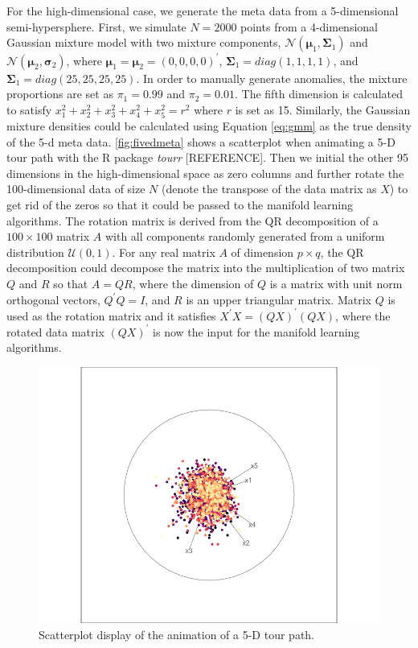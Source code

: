 \documentclass[11pt,a4paper,]{article}
\begin{document}
For the high-dimensional case, we generate the meta data from a 5-dimensional semi-hypersphere. First, we simulate \(N=2000\) points from a 4-dimensional Gaussian mixture model with two mixture components, \(\mathcal{N}(\pmb{\mu}_1, \pmb{\Sigma}_1)\) and \(\mathcal{N}(\pmb{\mu}_2, \pmb{\sigma}_2)\), where \(\pmb{\mu}_1 = \pmb{\mu}_2 =(0, 0, 0, 0)^\prime\), \(\pmb{\Sigma}_1 = diag(1,1,1,1)\), and \(\pmb{\Sigma}_1 = diag(25,25,25,25)\). In order to manually generate anomalies, the mixture proportions are set as \(\pi_1=0.99\) and \(\pi_2=0.01\).
The fifth dimension is calculated to satisfy \(x_1^2 + x_2^2 + x_3^2 + x_4^2 + x_5^2 = r^2\) where \(r\) is set as 15. Similarly, the Gaussian mixture densities could be calculated using Equation \eqref{eq:gmm} as the true density of the 5-d meta data. \autoref{fig:fivedmeta} shows a scatterplot when animating a 5-D tour path with the R package \emph{tourr} {[}REFERENCE{]}.
Then we initial the other 95 dimensions in the high-dimensional space as zero columns and further rotate the 100-dimensional data of size \(N\) (denote the transpose of the data matrix as \(X\)) to get rid of the zeros so that it could be passed to the manifold learning algorithms.
The rotation matrix is derived from the QR decomposition of a \(100\times 100\) matrix \(A\) with all components randomly generated from a uniform distribution \(\mathcal{U}(0,1)\).
For any real matrix \(A\) of dimension \(p\times q\), the QR decomposition could decompose the matrix into the multiplication of two matrix \(Q\) and \(R\) so that \(A = QR\), where the dimension of \(Q\) is a matrix with unit norm orthogonal vectors, \(Q^\prime Q = I\), and \(R\) is an upper triangular matrix. Matrix \(Q\) is used as the rotation matrix and it satisfies
\(X^\prime X=(QX)^\prime(QX)\), where the rotated data matrix \((QX)^\prime\) is now the input for the manifold learning algorithms.

\begin{figure}

{\centering \includegraphics[width=0.8\linewidth]{figures/tourr_5d_semisphere} 

}

\caption{Scatterplot display of the animation of a 5-D tour path.}\label{fig:fivedmeta}
\end{figure}
\end{document}
